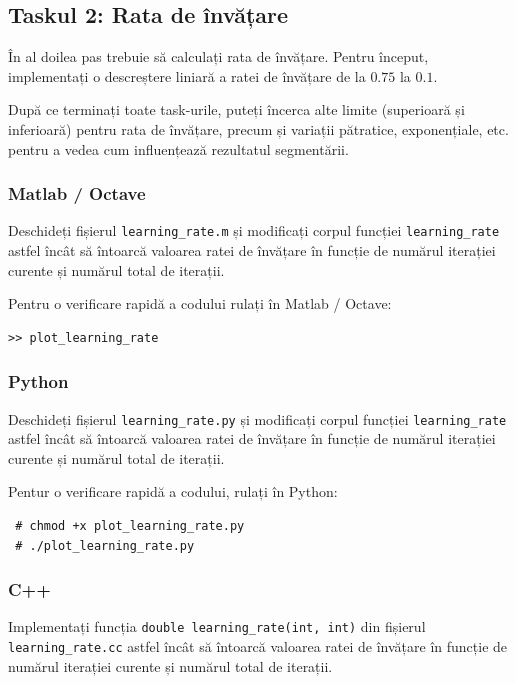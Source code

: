 \documentclass[12pt]{article}%
\newcommand{\mat}{{\color{brightmaroon} Matlab / Octave}}
\newcommand{\pyt}{{\color{cadmiumgreen} Python}}
\newcommand{\cc}{{\color{cobalt} C++}}
\begin{document}
\subsection{Taskul 2: Rata de învățare}
\label{sec:task2}

În al doilea pas trebuie să calculați rata de învățare. Pentru
început, implementați o descreștere liniară a ratei de învățare de la
$0.75$ la $0.1$.

După ce terminați toate task-urile, puteți încerca alte limite
(superioară și inferioară) pentru rata de învățare, precum și variații
pătratice, exponențiale, etc. pentru a vedea cum influențează
rezultatul segmentării.


\subsubsection*{\mat}
\label{mat2}

Deschideți fișierul \texttt{learning\_rate.m} și modificați corpul
funcției \texttt{learning\_rate} astfel încât să întoarcă valoarea
ratei de învățare în funcție de numărul iterației curente și numărul
total de iterații.

Pentru o verificare rapidă a codului rulați în \mat:
\begin{verbatim}
>> plot_learning_rate
\end{verbatim}

\subsubsection*{\pyt}
\label{pyt2}

Deschideți fișierul \texttt{learning\_rate.py} și modificați corpul
funcției \texttt{learning\_rate} astfel încât să întoarcă valoarea
ratei de învățare în funcție de numărul iterației curente și numărul
total de iterații.

Pentur o verificare rapidă a codului, rulați în Python:
\begin{verbatim}
 # chmod +x plot_learning_rate.py
 # ./plot_learning_rate.py
\end{verbatim}

\subsubsection*{\cc}
\label{cc2}

Implementați funcția \texttt{double learning\_rate(int, int)} din
fișierul \texttt{learning\_rate.cc}  astfel încât să întoarcă valoarea ratei de
învățare în funcție de numărul iterației curente și numărul total de
iterații.
\end{document}
